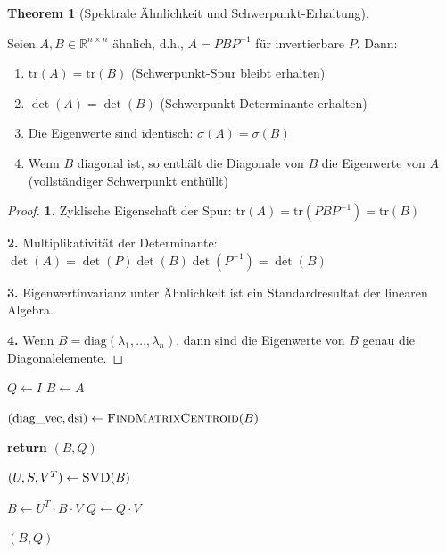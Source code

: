 \documentclass[a4paper,12pt]{article}
\theoremstyle{definition}
\newtheorem{theorem}{Theorem}
\begin{document}
\begin{theorem}[Spektrale Ähnlichkeit und Schwerpunkt-Erhaltung]
\label{thm:spektrale_aehnlichkeit}

Seien $A, B \in \mathbb{R}^{n \times n}$ ähnlich, d.h., $A = PBP^{-1}$ für invertierbare $P$. Dann:

\begin{enumerate}
\item $\text{tr}(A) = \text{tr}(B)$ (Schwerpunkt-Spur bleibt erhalten)
\item $\det(A) = \det(B)$ (Schwerpunkt-Determinante erhalten)
\item Die Eigenwerte sind identisch: $\sigma(A) = \sigma(B)$
\item Wenn $B$ diagonal ist, so enthält die Diagonale von $B$ die Eigenwerte von $A$ (vollständiger Schwerpunkt enthüllt)
\end{enumerate}

\begin{proof}
\textbf{1.} Zyklische Eigenschaft der Spur: $\text{tr}(A) = \text{tr}(PBP^{-1}) = \text{tr}(B)$

\textbf{2.} Multiplikativität der Determinante: $\det(A) = \det(P)\det(B)\det(P^{-1}) = \det(B)$

\textbf{3.} Eigenwertinvarianz unter Ähnlichkeit ist ein Standardresultat der linearen Algebra.

\textbf{4.} Wenn $B = \text{diag}(\lambda_1, \ldots, \lambda_n)$, dann sind die Eigenwerte von $B$ genau die Diagonalelemente.
\end{proof}
\end{theorem}

\begin{algorithm}[h]
\caption{Schwerpunkt-Offensive Diagonalisierung (Power-Iterations-Variante)}
\label{alg:schwerpunkt_diag}
\begin{algorithmic}[1]
	\State $Q \leftarrow I$ 
	\State $B \leftarrow A$ 
	
		\State $(\text{diag\_vec}, \text{dsi}) \leftarrow \textsc{FindMatrixCentroid}(B)$
		
		 
			\State \textbf{return} $(B, Q)$ 
		\EndIf
		
		\State $(U, S, V^T) \leftarrow \textsc{SVD}(B)$ 
		
		\State $B \leftarrow U^T \cdot B \cdot V$
		\State $Q \leftarrow Q \cdot V$
	\EndFor
	
	\State \Return $(B, Q)$
\EndProcedure
\end{algorithmic}
\end{algorithm}
\end{document}

